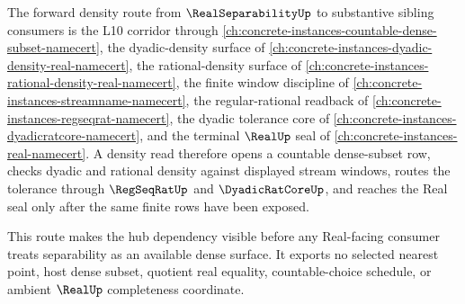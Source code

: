 The forward density route from $\RealSeparabilityUp$ to substantive sibling consumers is the L10 corridor through \autoref{ch:concrete-instances-countable-dense-subset-namecert}, the dyadic-density surface of \autoref{ch:concrete-instances-dyadic-density-real-namecert}, the rational-density surface of \autoref{ch:concrete-instances-rational-density-real-namecert}, the finite window discipline of \autoref{ch:concrete-instances-streamname-namecert}, the regular-rational readback of \autoref{ch:concrete-instances-regseqrat-namecert}, the dyadic tolerance core of \autoref{ch:concrete-instances-dyadicratcore-namecert}, and the terminal $\RealUp$ seal of \autoref{ch:concrete-instances-real-namecert}. A density read therefore opens a countable dense-subset row, checks dyadic and rational density against displayed stream windows, routes the tolerance through $\RegSeqRatUp$ and $\DyadicRatCoreUp$, and reaches the Real seal only after the same finite rows have been exposed.

This route makes the hub dependency visible before any Real-facing consumer treats separability as an available dense surface. It exports no selected nearest point, host dense subset, quotient real equality, countable-choice schedule, or ambient $\RealUp$ completeness coordinate.

